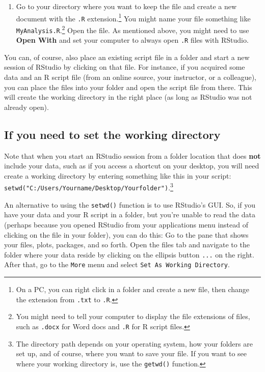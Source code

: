 \documentclass[
]{article}
\providecommand{\tightlist}{%
  \setlength{\itemsep}{0pt}\setlength{\parskip}{0pt}}
\begin{document}
\begin{enumerate}
\def\labelenumi{\arabic{enumi}.}
\setcounter{enumi}{1}
\tightlist
\item
  Go to your directory where you want to keep the file and create a new document with the \texttt{.R} extension.\footnote{On a PC, you can right click in a folder and create a new file, then change the extension from \texttt{.txt} to \texttt{.R}.} You might name your file something like \texttt{MyAnalysis.R}.\footnote{You might need to tell your computer to display the file extensions of files, such as \texttt{.docx} for Word docs and \texttt{.R} for R script files.} Open the file. As mentioned above, you might need to use \textbf{Open With} and set your computer to always open \texttt{.R} files with RStudio.
\end{enumerate}

You can, of course, also place an existing script file in a folder and start a new session of RStudio by clicking on that file. For instance, if you acquired some data and an R script file (from an online source, your instructor, or a colleague), you can place the files into your folder and open the script file from there. This will create the working directory in the right place (as long as RStudio was not already open).

\hypertarget{if-you-need-to-set-the-working-directory}{%
\subsection{If you need to set the working directory}\label{if-you-need-to-set-the-working-directory}}

Note that when you start an RStudio session from a folder location that does \textbf{not} include your data, such as if you access a shortcut on your desktop, you will need create a working directory by entering something like this in your script: \texttt{setwd("C:/Users/Yourname/Desktop/Yourfolder")}.\footnote{The directory path depends on your operating system, how your folders are set up, and of course, where you want to save your file. If you want to see where your working directory is, use the \texttt{getwd()} function.}

An alternative to using the \texttt{setwd()} function is to use RStudio's GUI. So, if you have your data and your R script in a folder, but you're unable to read the data (perhaps because you opened RStudio from your applications menu instead of clicking on the file in your folder), you can do this: Go to the pane that shows your files, plots, packages, and so forth. Open the files tab and navigate to the folder where your data reside by clicking on the ellipsis button \texttt{...} on the right. After that, go to the \texttt{More} menu and select \texttt{Set\ As\ Working\ Directory}.
\end{document}
